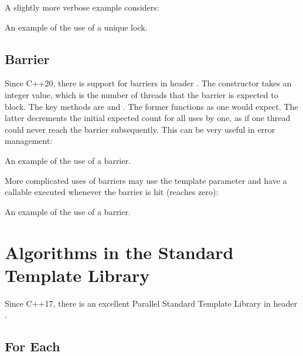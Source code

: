 \begin{itemize}
\begin{end}
A slightly more verbose example considers:

\raggedbottom
\begin{codebox}[]{\href{https://godbolt.org/z/T8saW1sEv}{\ExternalLink}}
\footnotesize An example of the use of a unique lock.
\tcblower
{}
\end{codebox}

\subsection{Barrier}

Since C++20, there is support for barriers in header . The constructor takes an integer value, which is the number of threads that the barrier is expected to block. The key methods are  and . The former functions as one would expect. The latter decrements the initial expected count for all uses by one, as if one thread could never reach the barrier subsequently. This can be very useful in error management:

\raggedbottom
\begin{codebox}[]{\href{https://godbolt.org/z/KrzfYe88s}{\ExternalLink}}
\footnotesize An example of the use of a barrier.
\tcblower
{}
\end{codebox}

More complicated uses of barriers may use the template parameter  and have a callable executed whenever the barrier is hit (reaches zero):

\raggedbottom
\begin{codebox}[]{\href{https://godbolt.org/z/EjW8xc8fc}{\ExternalLink}}
\footnotesize An example of the use of a barrier.
\tcblower
{}
\end{codebox}

\section{Algorithms in the Standard Template Library}

Since C++17, there is an excellent Parallel Standard Template Library in header .

\subsection{For Each}
\label{sec:foreachcpp23}


\end{end}
\end{itemize}
